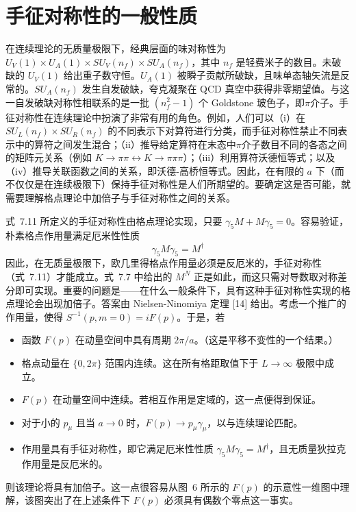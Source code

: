 \section{手征对称性的一般性质}

在连续理论的无质量极限下，经典层面的味对称性为 $U_V(1) \times U_A(1) \times SU_V(n_f) \times SU_A(n_f)$，其中 $n_f$ 是轻费米子的数目。未破缺的 $U_V(1)$ 给出重子数守恒。$U_A(1)$ 被瞬子贡献所破缺，且味单态轴矢流是反常的。$SU_A(n_f)$ 发生自发破缺，夸克凝聚在 QCD 真空中获得非零期望值。与这一自发破缺对称性相联系的是一批 $(n_f^2 - 1)$ 个 Goldstone 玻色子，即$\pi$介子。手征对称性在连续理论中扮演了非常有用的角色。例如，人们可以（i）在 $SU_L(n_f) \times SU_R(n_f)$ 的不同表示下对算符进行分类，而手征对称性禁止不同表示中的算符之间发生混合；（ii）推导给定算符在末态中$\pi$介子数目不同的各态之间的矩阵元关系（例如 $K \to \pi\pi \leftrightarrow K \to \pi\pi\pi$）；（iii）利用算符沃德恒等式；以及（iv）推导关联函数之间的关系，即沃德-高桥恒等式。因此，在有限的 $a$ 下（而不仅仅是在连续极限下）保持手征对称性是人们所期望的。要确定这是否可能，就需要理解格点理论中加倍子与手征对称性之间的关系。

式~7.11 所定义的手征对称性由格点理论实现，只要 $\gamma_5 M + M \gamma_5 = 0$。容易验证，朴素格点作用量满足厄米性性质
\begin{equation}
\gamma_5 M \gamma_5 = M^\dagger
\end{equation}
因此，在无质量极限下，欧几里得格点作用量必须是反厄米的，手征对称性（式~7.11）才能成立。式~7.7 中给出的 $M^N$ 正是如此，而这只需对导数取对称差分即可实现。重要的问题是——在什么一般条件下，具有这种手征对称性实现的格点理论会出现加倍子。答案由 Nielsen-Ninomiya 定理 [14] 给出。考虑一个推广的作用量，使得 $S^{-1}(p, m = 0) = iF(p)$。于是，若
\begin{itemize}
\item 函数 $F(p)$ 在动量空间中具有周期 $2\pi/a$。（这是平移不变性的一个结果。）
\item 格点动量在 $\{0, 2\pi\}$ 范围内连续。这在所有格距取值下于 $L \to \infty$ 极限中成立。
\item $F(p)$ 在动量空间中连续。若相互作用是定域的，这一点便得到保证。
\item 对于小的 $p_\mu$ 且当 $a \to 0$ 时，$F(p) \to p_\mu \gamma_\mu$，以与连续理论匹配。
\item 作用量具有手征对称性，即它满足厄米性性质 $\gamma_5 M \gamma_5 = M^\dagger$，且无质量狄拉克作用量是反厄米的。
\end{itemize}
则该理论将具有加倍子。这一点很容易从图~6 所示的 $F(p)$ 的示意性一维图中理解，该图突出了在上述条件下 $F(p)$ 必须具有偶数个零点这一事实。

